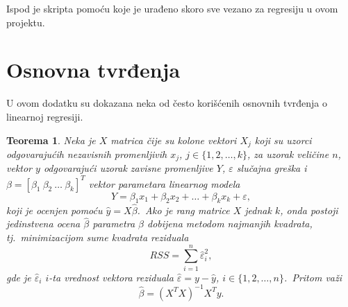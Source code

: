 \documentclass[12pt,a4paper,titlepage,oneside]{article}
\numberwithin{equation}{section}
\numberwithin{figure}{section}
\numberwithin{table}{section}
\newtheorem{thm}{Teorema}[section]
\theoremstyle{definition}
\theoremstyle{remark}
\begin{document}
\begin{appendices}
Ispod je skripta pomoću koje je urađeno skoro sve vezano za regresiju u ovom projektu.


\newpage

\thispagestyle{empty}

\section{Osnovna tvrđenja}\label{OT}

\setcounter{footnote}{0}

U ovom dodatku su dokazana neka od često korišćenih osnovnih tvrđenja o linearnoj regresiji.

\begin{thm}\label{teorema}
	Neka je $X$ matrica čije su kolone vektori $X_j$ koji su uzorci odgovarajućih nezavisnih promenljivih $x_j$, $j\in \lbrace 1, 2, \dots , k\rbrace$, za uzorak veličine $n$, vektor $y$ odgovarajući uzorak zavisne promenljive $Y$, $\varepsilon$ slučajna greška i $\beta = [\beta_1 ~\beta_2 ~\dots ~\beta_k ]^T$ vektor parametara linearnog modela \[Y = \beta_1 x_1 + \beta_2 x_2 + \dots + \beta_k x_k + \varepsilon ,\] koji je ocenjen pomoću $\hat{y} = X\hat{\beta}$.\ Ako je rang matrice $X$ jednak $k$, onda postoji jedinstvena ocena $\hat{\beta}$ parametra $\beta$ dobijena metodom najmanjih kvadrata, tj.\ minimizacijom sume kvadrata reziduala \[RSS = \sum\limits_{i = 1}^{n} \hat{\varepsilon}^2_i ,\] gde je $\hat{\varepsilon}_i$ $i$-ta vrednost vektora reziduala $\hat{\varepsilon} = y - \hat{y}$, $i\in \lbrace 1, 2, \dots , n\rbrace$.\ Pritom važi \[\hat{\beta} = (X^T X)^{-1} X^T y.\]
\end{thm}


\end{appendices}
\end{document}
